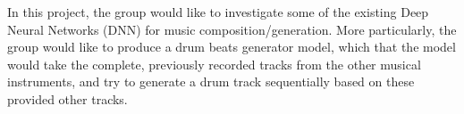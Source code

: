 \begin{par}
    \par \hspace{15pt} In this project, the group would like to investigate some of the existing Deep Neural Networks (DNN) for music composition/generation. More particularly, the group would like to produce a drum beats generator model, which that the model would take the complete, previously recorded tracks from the other musical instruments, and try to generate a drum track sequentially based on these provided other tracks. 
    
\end{par}